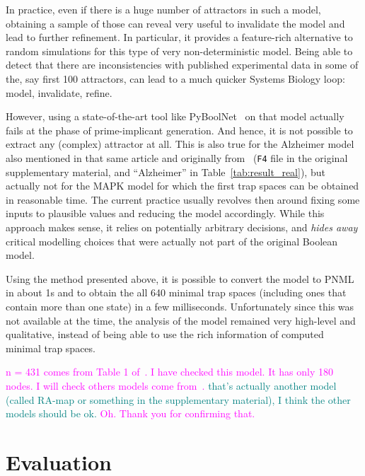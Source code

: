 \documentclass[runningheads]{llncs}
\newcommand{\vangiang}[1]{\textcolor{magenta}{#1}}
\newcommand{\sylvain}[1]{\textcolor{teal}{#1}}
\begin{document}
In practice, even if there is a huge number of attractors in such a model, obtaining a sample of those can reveal very useful to invalidate the model and lead to further refinement.
In particular, it provides a feature-rich alternative to random simulations for this type of very non-deterministic model.
Being able to detect that there are inconsistencies with published experimental data in some of the, say first 100 attractors, can lead to a much quicker Systems Biology loop: model, invalidate, refine.

However, using a state-of-the-art tool like PyBoolNet~\cite{klarner2015computing} on that model actually fails at the phase of prime-implicant generation.
And hence, it is not possible to extract any (complex) attractor at all.
This is also true for the Alzheimer model also mentioned in that same article and originally from~\cite{ogishima2016alzpathway} (\verb|F4| file in the original supplementary material, and ``Alzheimer'' in Table~\ref{tab:result_real}), but actually not for the MAPK model for which the first trap spaces can be obtained in reasonable time.
The current practice usually revolves then around fixing some inputs to plausible values and reducing the model accordingly.
While this approach makes sense, it relies on potentially arbitrary decisions, and \emph{hides away} critical modelling choices that were actually not part of the original Boolean model.

Using the method presented above, it is possible to convert the model to PNML in about 1s and to obtain the all 640 minimal trap spaces (including ones that contain more than one state) in a few milliseconds.
Unfortunately since this was not available at the time, the analysis of the model remained very high-level and qualitative, instead of being able to use the rich information of computed minimal trap spaces.

\vangiang{n = 431 comes from Table 1 of~\cite{aghamiri2020automated}. I have checked this model. It has only 180 nodes. I will check others models come from~\cite{aghamiri2020automated}.}
\sylvain{that's actually another model (called RA-map or something in the supplementary material), I think the other models should be ok.}
\vangiang{Oh. Thank you for confirming that.}

\section{Evaluation}
\label{sec:eval}
\end{document}
